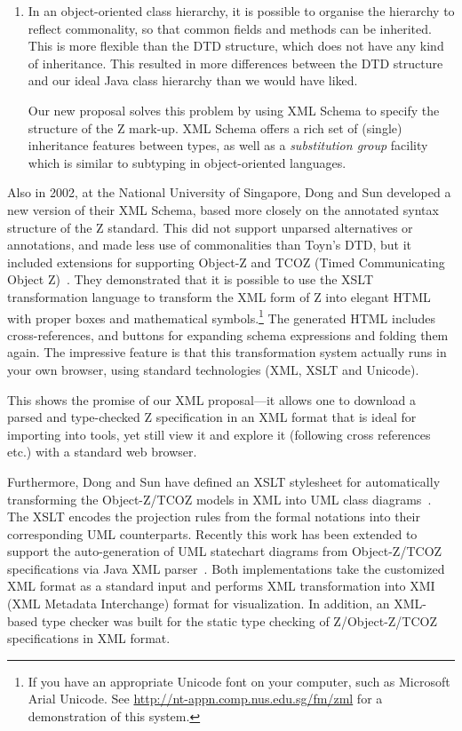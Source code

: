 \documentclass{llncs}  %
\begin{document}
\begin{enumerate}
\item In an object-oriented class hierarchy, it is possible to organise
  the hierarchy to reflect commonality, so that common fields and methods
  can be inherited.  This is more flexible than the DTD structure, which
  does not have any kind of inheritance.  This resulted in more differences
  between the DTD structure and our ideal Java class hierarchy than we
  would have liked. 

  Our new proposal solves this problem by using XML Schema to specify the
  structure of the Z mark-up.  XML Schema offers a rich set of (single)
  inheritance features between types, as well as a \emph{substitution
  group} facility which is similar to subtyping in object-oriented
  languages.  
\end{enumerate}


Also in 2002, at the National University of Singapore, Dong and Sun
developed a new version of their XML Schema, based more closely on
the annotated syntax structure of the Z standard.  This did not
support unparsed alternatives or annotations, and made less use of
commonalities than Toyn's DTD, but it included extensions 
for supporting Object-Z and TCOZ (Timed Communicating Object Z)~\cite{md99a}.
They demonstrated that it is possible to use the XSLT transformation
language to transform the XML form of Z into elegant HTML with proper boxes
and mathematical symbols.\footnote{If you have an appropriate Unicode
  font on your computer, such as Microsoft Arial Unicode.  See
  \url{http://nt-appn.comp.nus.edu.sg/fm/zml} for 
  a demonstration of this system.} 
The generated HTML includes cross-references, and buttons for
expanding schema expressions and folding them again.  The impressive
feature is that this transformation system actually runs in your own
browser, using standard technologies (XML, XSLT and Unicode).

This shows the promise of our XML proposal---it allows one to download a parsed
and type-checked Z specification in an XML format that is ideal for
importing into tools, yet still view it and explore it (following
cross references etc.) with a standard web browser.

Furthermore, Dong and Sun have defined an XSLT stylesheet for
automatically transforming the Object-Z/TCOZ models in XML into UML
class diagrams~\cite{sd02}. The XSLT encodes the projection rules
from the formal notations into their corresponding UML
counterparts. Recently this work has been extended to support the
auto-generation of UML statechart diagrams from Object-Z/TCOZ
specifications via Java XML parser~\cite{dong02icfem}. Both
implementations take the customized XML format as a standard input and
performs XML transformation into XMI (XML Metadata Interchange) format
for visualization. In addition, an XML-based type checker was built
for the static type checking of Z/Object-Z/TCOZ specifications in XML
format.
\end{document}

